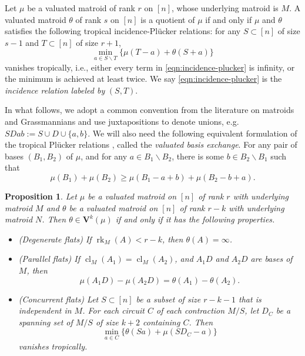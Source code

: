 \documentclass{article}
\newtheorem{proposition}[theorem]{Proposition}
\theoremstyle{definition}
\newcommand{\rk}{\operatorname{rk}}
\newcommand{\cl}{\operatorname{cl}}
\newcommand{\bV}{\mathbf V}
\begin{document}
 Let $\mu$ be a valuated matroid of rank $r$ on $[n]$, whose underlying matroid is $M$. A valuated matroid $\theta$ of rank $s$ on $[n]$ is a quotient of $\mu$ if and only if $\mu$ and $\theta$ satisfies the following tropical incidence-Pl\"ucker relations: for any $S\subset [n]$ of size $s-1$ and $T\subset [n]$ of size $r+1$,
\begin{equation}\label{eqn:incidence-plucker}
    \min_{a\in S\smallsetminus T}\{\mu(T-a)+\theta(S+a)\}
\end{equation}
 vanishes tropically, i.e., either every term in \eqref{eqn:incidence-plucker} is infinity, or the minimum is achieved at least twice. We say \eqref{eqn:incidence-plucker} is the \textit{incidence relation} \textit{labeled by} $(S,T)$.


In what follows, we adopt a common convention from the literature on matroids and Grassmannians and use juxtapositions to denote unions, e.g. $SDab := S \cup D \cup \{a,b\}$. We will also need the following equivalent formulation of the tropical Plücker relations \cite{brandt2021tropical}, called the \textit{valuated basis exchange}. For any pair of bases $(B_1,B_2)$ of $\mu$, and for any $a\in B_1\smallsetminus B_2$, there is some $b\in B_2\smallsetminus B_1$ such that 
    \[\mu(B_1)+\mu(B_2)\geq \mu(B_1-a+b)+\mu(B_2-b+a).\]

\begin{proposition}\label{prop:essential-relations}
Let $\mu$ be a valuated matroid on $[n]$ of rank $r$ with underlying matroid $M$ and $\theta$ be a valuated matroid on $[n]$ of rank $r-k$ with underlying matroid $N$. Then $\theta\in \bV^k(\mu)$ if and only if it has the following properties. 

     \begin{itemize}
     \itemsep0em
         \item \emph{(Degenerate flats)} \hspace{0 em} If $\rk_M(A)<r-k$, then $\theta(A)=\infty$.
         \item \emph{(Parallel flats)} \hspace{1.5 em} If  $\cl_M(A_1)=\cl_M(A_2)$, and $A_1D$ and $A_2D$ are bases of $M$, then $$\mu(A_1 D)-\mu(A_2 D)=\theta(A_1)-\theta(A_2).$$ 
         \item \emph{(Concurrent flats)} \hspace{0 em} Let $S \subset [n]$ be a subset of size $r-k-1$ that is  independent in $M$. For each circuit $C$ of each contraction $M/S$, let $D_C$ be a spanning set of $M/S$ of size $k+2$ containing $C$. Then
         \begin{equation}\label{eqn:concurrent-flats}
             \min_{a\in C}\{\theta(S a)+\mu(S D_C -a)\}
         \end{equation}
         vanishes tropically. 
     \end{itemize}
 \end{proposition}
 
\end{document}
